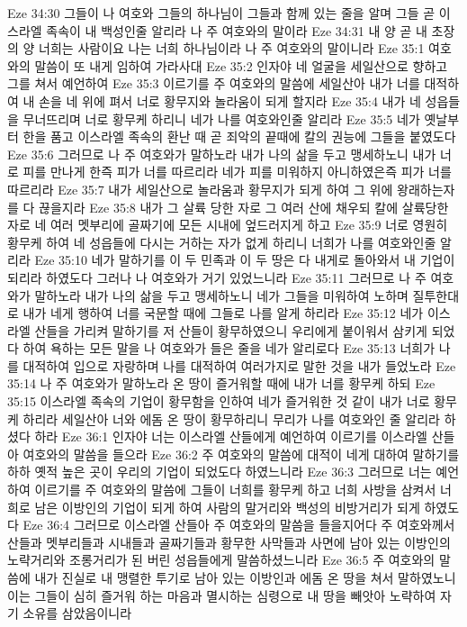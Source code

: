 Eze 34:30  그들이 나 여호와 그들의 하나님이 그들과 함께 있는 줄을 알며 그들 곧 이스라엘 족속이 내 백성인줄 알리라 나 주 여호와의 말이라
Eze 34:31  내 양 곧 내 초장의 양 너희는 사람이요 나는 너희 하나님이라 나 주 여호와의 말이니라
Eze 35:1  여호와의 말씀이 또 내게 임하여 가라사대
Eze 35:2  인자야 네 얼굴을 세일산으로 향하고 그를 쳐서 예언하여
Eze 35:3  이르기를 주 여호와의 말씀에 세일산아 내가 너를 대적하여 내 손을 네 위에 펴서 너로 황무지와 놀라움이 되게 할지라
Eze 35:4  내가 네 성읍들을 무너뜨리며 너로 황무케 하리니 네가 나를 여호와인줄 알리라
Eze 35:5  네가 옛날부터 한을 품고 이스라엘 족속의 환난 때 곧 죄악의 끝때에 칼의 권능에 그들을 붙였도다
Eze 35:6  그러므로 나 주 여호와가 말하노라 내가 나의 삶을 두고 맹세하노니 내가 너로 피를 만나게 한즉 피가 너를 따르리라 네가 피를 미워하지 아니하였은즉 피가 너를 따르리라
Eze 35:7  내가 세일산으로 놀라움과 황무지가 되게 하여 그 위에 왕래하는자를 다 끊을지라
Eze 35:8  내가 그 살륙 당한 자로 그 여러 산에 채우되 칼에 살륙당한 자로 네 여러 멧부리에 골짜기에 모든 시내에 엎드러지게 하고
Eze 35:9  너로 영원히 황무케 하여 네 성읍들에 다시는 거하는 자가 없게 하리니 너희가 나를 여호와인줄 알리라
Eze 35:10  네가 말하기를 이 두 민족과 이 두 땅은 다 내게로 돌아와서 내 기업이 되리라 하였도다 그러나 나 여호와가 거기 있었느니라
Eze 35:11  그러므로 나 주 여호와가 말하노라 내가 나의 삶을 두고 맹세하노니 네가 그들을 미워하여 노하며 질투한대로 내가 네게 행하여 너를 국문할 때에 그들로 나를 알게 하리라
Eze 35:12  네가 이스라엘 산들을 가리켜 말하기를 저 산들이 황무하였으니 우리에게 붙이워서 삼키게 되었다 하여 욕하는 모든 말을 나 여호와가 들은 줄을 네가 알리로다
Eze 35:13  너희가 나를 대적하여 입으로 자랑하며 나를 대적하여 여러가지로 말한 것을 내가 들었노라
Eze 35:14  나 주 여호와가 말하노라 온 땅이 즐거워할 때에 내가 너를 황무케 하되
Eze 35:15  이스라엘 족속의 기업이 황무함을 인하여 네가 즐거워한 것 같이 내가 너로 황무케 하리라 세일산아 너와 에돔 온 땅이 황무하리니 무리가 나를 여호와인 줄 알리라 하셨다 하라
Eze 36:1  인자야 너는 이스라엘 산들에게 예언하여 이르기를 이스라엘 산들아 여호와의 말씀을 들으라
Eze 36:2  주 여호와의 말씀에 대적이 네게 대하여 말하기를 하하 옛적 높은 곳이 우리의 기업이 되었도다 하였느니라
Eze 36:3  그러므로 너는 예언하여 이르기를 주 여호와의 말씀에 그들이 너희를 황무케 하고 너희 사방을 삼켜서 너희로 남은 이방인의 기업이 되게 하여 사람의 말거리와 백성의 비방거리가 되게 하였도다
Eze 36:4  그러므로 이스라엘 산들아 주 여호와의 말씀을 들을지어다 주 여호와께서 산들과 멧부리들과 시내들과 골짜기들과 황무한 사막들과 사면에 남아 있는 이방인의 노략거리와 조롱거리가 된 버린 성읍들에게 말씀하셨느니라
Eze 36:5  주 여호와의 말씀에 내가 진실로 내 맹렬한 투기로 남아 있는 이방인과 에돔 온 땅을 쳐서 말하였노니 이는 그들이 심히 즐거워 하는 마음과 멸시하는 심령으로 내 땅을 빼앗아 노략하여 자기 소유를 삼았음이니라

